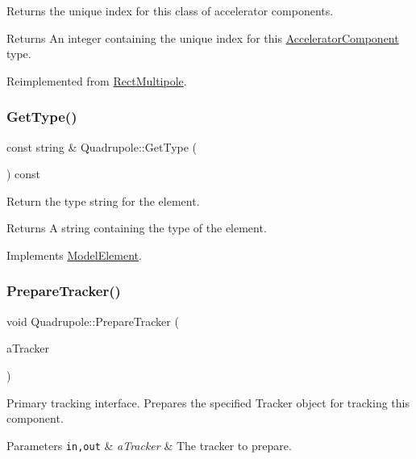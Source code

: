 Returns the unique index for this class of accelerator components. \begin{DoxyReturn}{Returns}
An integer containing the unique index for this \hyperlink{classAcceleratorComponent}{Accelerator\+Component} type. 
\end{DoxyReturn}


Reimplemented from \hyperlink{classRectMultipole_a9bc789b2a193e341aab8bbd47a0e3ad4}{Rect\+Multipole}.

\mbox{\label{classQuadrupole_aa8d08b76a82688cbb9161b120114faff}} 
\subsubsection{\texorpdfstring{Get\+Type()}{GetType()}}
{\footnotesize\ttfamily const string \& Quadrupole\+::\+Get\+Type (\begin{DoxyParamCaption}{ }\end{DoxyParamCaption}) const\hspace{0.3cm}{\ttfamily [virtual]}}

Return the type string for the element. \begin{DoxyReturn}{Returns}
A string containing the type of the element. 
\end{DoxyReturn}


Implements \hyperlink{classModelElement_a04dc2e51e1999fca612eb1838ec6b271}{Model\+Element}.

\mbox{\label{classQuadrupole_aa0160bdc8c7be3d48e400a9698907b15}} 
\subsubsection{\texorpdfstring{Prepare\+Tracker()}{PrepareTracker()}}
{\footnotesize\ttfamily void Quadrupole\+::\+Prepare\+Tracker (\begin{DoxyParamCaption}\item[{\hyperlink{classComponentTracker}{Component\+Tracker} \&}]{a\+Tracker }\end{DoxyParamCaption})\hspace{0.3cm}{\ttfamily [virtual]}}

Primary tracking interface. Prepares the specified Tracker object for tracking this component. 
\begin{DoxyParams}[1]{Parameters}
\mbox{\tt in,out}  & {\em a\+Tracker} & The tracker to prepare. \\
\hline
\end{DoxyParams}


